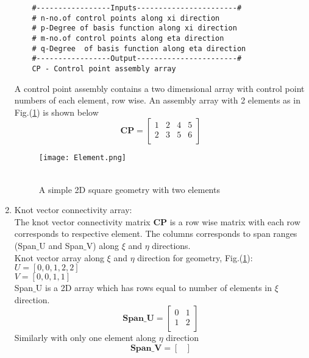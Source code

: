 \documentclass[11pt]{article}
\begin{document}
\begin{enumerate}[leftmargin=*]
\begin{verbatim}
	#-----------------Inputs-----------------------#
	# n-no.of control points along xi direction
	# p-Degree of basis function along xi direction
	# m-no.of control points along eta direction
	# q-Degree  of basis function along eta direction
	#-----------------Output-----------------------#
	CP - Control point assembly array
	\end{verbatim}
	A control point assembly contains a two dimensional array with control point numbers of each element, row wise.
	An assembly array with 2 elements as in Fig.(\ref{Element}) is shown below
	\begin{equation} \label{CPassembly}
	\textbf{CP} =
	\begin{bmatrix}
		1 & 2 & 4 & 5 \\
		2 & 3 & 5 & 6 \\
	\end{bmatrix}
	\end{equation}
	\begin{figure}[H]
		\begin{center}
			\texttt{[image: Element.png]} 
			\caption{\\A simple 2D square geometry with two elements}\label{Element}
		\end{center}	
	\end{figure}
	\item Knot vector connectivity array: \\
	The knot vector connectivity matrix \textbf{CP} is a row wise matrix with each row
	corresponds to respective element. The columns corresponds to span
	ranges (Span$\_$U and Span$\_$V) along $\xi$ and $\eta$ directions. \\
	Knot vector array along $\xi$ and $\eta$ direction for geometry, Fig.(\ref{Element}): \\
	$U = [ 0, 0, 1, 2, 2 ]$ \\
	$V = [ 0, 0, 1, 1 ]$ \\
	Span$\_$U is a 2D array which has rows equal to number of elements in $\xi$ direction.
	\begin{equation} \label{SpanU}
	\textbf{Span\_U} =
	\begin{bmatrix}
	0 & 1  \\
	1 & 2  \\
	\end{bmatrix}
	\end{equation}
	Similarly with only one element along $\eta$ direction
	\begin{equation} \label{SpanU}
	\textbf{Span\_V} =
	\begin{bmatrix}

\end{bmatrix}
\end{equation}
\end{enumerate}
\end{document}
